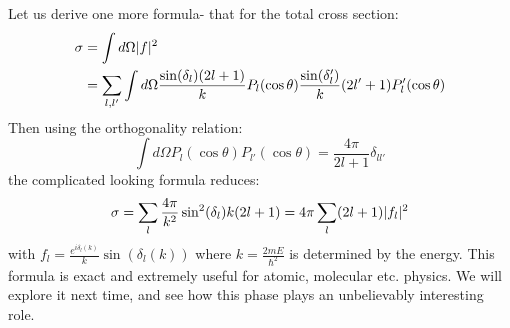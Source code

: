 Let us derive one more formula- that for the total cross section:
\begin{equation}
    \begin{split}
        \sigma &= \int d\Omega \lvert f \rvert^2
        \\ &= \sum_{l,l'}\int d\Omega \frac{\sin(\delta_l)(2l+1)}{k}P_l(\cos\theta) \frac{\sin(\delta_l')}{k}(2l'+1)P_l'(\cos\theta)
    \end{split} 
\end{equation}
Then using the orthogonality relation:
\begin{equation}
    \int d\Omega P_l(\cos\theta)P_{l'}(\cos\theta) = \frac{4\pi}{2l+1}\delta_{ll'}
\end{equation}
the complicated looking formula reduces:
\begin{equation}
    \sigma = \sum_l \frac{4\pi}{k^2}\sin^2(\delta_l) k(2l+1) = 4\pi \sum_l (2l+1)\lvert f_l \rvert^2 
\end{equation}
with $f_l = \frac{e^{i\delta_l(k)}}{k}\sin(\delta_l(k))$ where $k = \frac{2mE}{\hbar^2}$ is determined by the energy. This formula is exact and extremely useful for atomic, molecular etc. physics. We will explore it next time, and see how this phase plays an unbelievably interesting role.